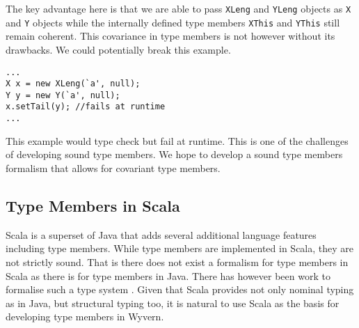 \documentclass[11pt
              , a4paper
              , twoside
              , openright
              ]{report}
\numberwithin{case}{theorem}
\numberwithin{subcase}{case}
\begin{document}
The key advantage here is that we are able to pass \verb|XLeng| and \verb|YLeng| objects as \verb|X| and \verb|Y| objects while the internally defined type members \verb|XThis| and \verb|YThis| still remain coherent. This covariance in type members is not however without its drawbacks. We could potentially break this example.
\begin{lstlisting}[mathescape, style=customlang]
...
X x = new XLeng(`a', null);
Y y = new Y(`a', null);
x.setTail(y); //fails at runtime
...
\end{lstlisting}
This example would type check but fail at runtime. This is one of the challenges of developing sound type members. We hope to develop a sound type members formalism that allows for covariant type members.

\subsection{Type Members in Scala}\label{scala:dot}
Scala \cite{scaladocs2016} is a superset of Java that adds several additional language features including type members. While type members are implemented in Scala, they are not strictly sound. That is there does not exist a formalism for type members in Scala as there is for type members in Java. There has however been work to formalise such a type system \cite{Amin:2014:FPT:2660193.2660216,amin:fool:2012}. Given that Scala provides not only nominal typing as in Java, but structural typing too, it is natural to use Scala as the basis for developing type members in Wyvern.
\end{document}

